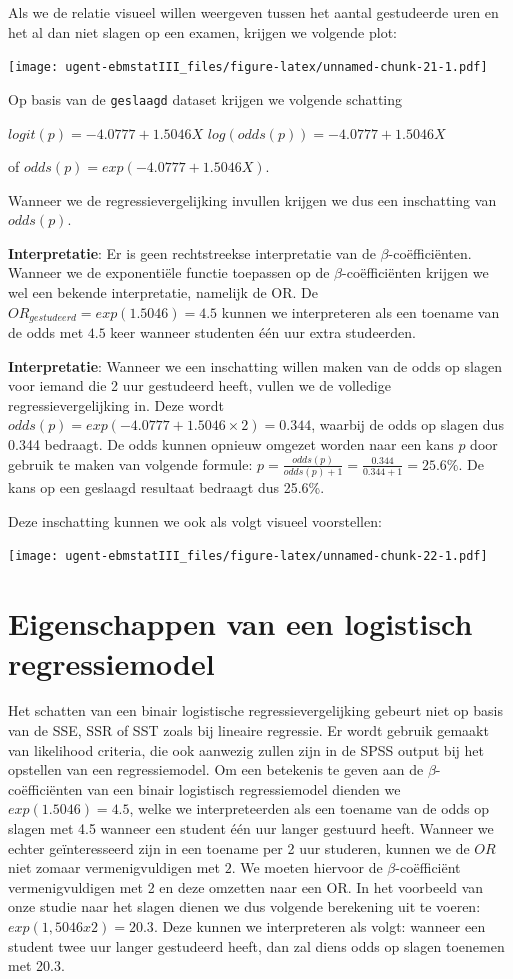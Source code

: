 \documentclass[
]{book}
\theoremstyle{definition}
\theoremstyle{definition}
\theoremstyle{definition}
\theoremstyle{definition}
\theoremstyle{remark}
\begin{document}
Als we de relatie visueel willen weergeven tussen het aantal gestudeerde uren en het al dan niet slagen op een examen, krijgen we volgende plot:

\texttt{[image: ugent-ebmstatIII\_files/figure-latex/unnamed-chunk-21-1.pdf]}

Op basis van de \texttt{geslaagd} dataset krijgen we volgende schatting

\(logit(p) = -4.0777 + 1.5046X\) \(log(odds(p)) = -4.0777 + 1.5046X\)

of \(odds(p) = exp(-4.0777 + 1.5046X)\).

Wanneer we de regressievergelijking invullen krijgen we dus een inschatting van \(odds(p)\).

\textbf{Interpretatie}: Er is geen rechtstreekse interpretatie van de \(\beta\)-coëfficiënten. Wanneer we de exponentiële functie toepassen op de \(\beta\)-coëfficiënten krijgen we wel een bekende interpretatie, namelijk de OR. De \(OR_{gestudeerd} = exp(1.5046) = 4.5\) kunnen we interpreteren als een toename van de odds met \(4.5\) keer wanneer studenten één uur extra studeerden.

\textbf{Interpretatie}: Wanneer we een inschatting willen maken van de odds op slagen voor iemand die 2 uur gestudeerd heeft, vullen we de volledige regressievergelijking in. Deze wordt \(odds(p) = exp(-4.0777 + 1.5046 \times 2) = 0.344\), waarbij de odds op slagen dus 0.344 bedraagt. De odds kunnen opnieuw omgezet worden naar een kans \(p\) door gebruik te maken van volgende formule: \(p = \frac{odds(p)}{odds(p)+1} = \frac{0.344}{0.344+1} = 25.6\%\). De kans op een geslaagd resultaat bedraagt dus 25.6\%.

Deze inschatting kunnen we ook als volgt visueel voorstellen:

\texttt{[image: ugent-ebmstatIII\_files/figure-latex/unnamed-chunk-22-1.pdf]}

\hypertarget{eigenschappen-van-een-logistisch-regressiemodel}{%
\section*{Eigenschappen van een logistisch regressiemodel}\label{eigenschappen-van-een-logistisch-regressiemodel}}


Het schatten van een binair logistische regressievergelijking gebeurt niet op basis van de SSE, SSR of SST zoals bij lineaire regressie. Er wordt gebruik gemaakt van likelihood criteria, die ook aanwezig zullen zijn in de SPSS output bij het opstellen van een regressiemodel. Om een betekenis te geven aan de \(\beta\)-coëfficiënten van een binair logistisch regressiemodel dienden we \(exp(1.5046) = 4.5\), welke we interpreteerden als een toename van de odds op slagen met 4.5 wanneer een student één uur langer gestuurd heeft. Wanneer we echter geïnteresseerd zijn in een toename per 2 uur studeren, kunnen we de \(OR\) niet zomaar vermenigvuldigen met \(2\). We moeten hiervoor de \(\beta\)-coëfficiënt vermenigvuldigen met 2 en deze omzetten naar een OR. In het voorbeeld van onze studie naar het slagen dienen we dus volgende berekening uit te voeren: \(exp(1,5046 x 2) = 20.3\). Deze kunnen we interpreteren als volgt: wanneer een student twee uur langer gestudeerd heeft, dan zal diens odds op slagen toenemen met 20.3.
\end{document}
